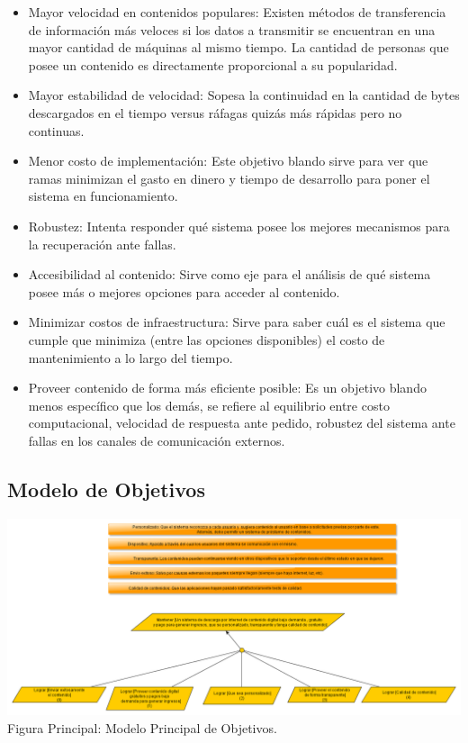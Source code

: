 \documentclass[11pt, a4paper, spanish]{article}
\begin{document}
	\begin{itemize}

	\item{ Mayor velocidad en contenidos populares: Existen m\'etodos de transferencia de informaci\'on m\'as veloces si los datos a transmitir se 	
	encuentran en una mayor cantidad de m\'aquinas al mismo tiempo. La cantidad de personas que posee un contenido es directamente proporcional a su 
	popularidad.}

	\item{ Mayor estabilidad de velocidad: Sopesa la continuidad en la cantidad de bytes descargados en el tiempo versus r\'afagas quiz\'as m\'as 
	r\'apidas pero no continuas.}

	\item{ Menor costo de implementaci\'on: Este objetivo blando sirve para ver que ramas minimizan el gasto en dinero y tiempo de desarrollo 	
	para poner el sistema en funcionamiento. }

	\item{ Robustez: Intenta responder qu\'e sistema posee los mejores mecanismos para la recuperaci\'on ante fallas.}
    
	\item{ Accesibilidad al contenido: Sirve como eje para el an\'alisis de qu\'e sistema posee m\'as o mejores opciones para acceder al contenido.}

	\item{ Minimizar costos de infraestructura: Sirve para saber cu\'al es el sistema que cumple que minimiza (entre las opciones disponibles) el 
	costo de mantenimiento a lo largo del tiempo.}

	\item{ Proveer contenido de forma m\'as eficiente posible: Es un objetivo blando menos espec\'ifico que los dem\'as, se refiere al equilibrio entre 
	costo computacional, velocidad de respuesta ante pedido, robustez del sistema ante fallas en los canales de comunicaci\'on externos.}

	\end{itemize}

\subsection{Modelo de Objetivos}

	\begin{center}
		\includegraphics[scale=0.35]{Diagramas/ModelodeObjetivosPrincipal.png}
		\small{Figura Principal: Modelo Principal de Objetivos.}
	\end{center}
\end{document}
